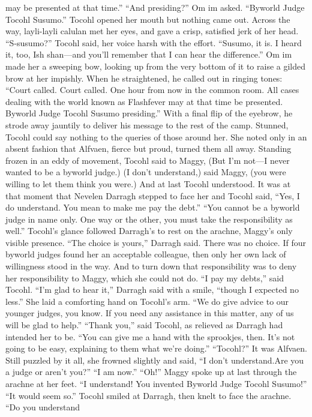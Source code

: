 \documentclass[9pt]{article}
\begin{document}
may be presented at that time.”
“And presiding?” Om im asked.
“Byworld Judge Tocohl Susumo.”
Tocohl opened her mouth but nothing came out. Across the way, layli-layli calulan met her eyes,
and gave a crisp, satisfied jerk of her head.
“S-susumo?” Tocohl said, her voice harsh with the effort.
“Susumo, it is. I heard it, too, Ish shan—and you’ll remember that I can hear the difference.” Om im
made her a sweeping bow, looking up from the very bottom of it to raise a gilded brow at her impishly.
When he straightened, he called out in ringing tones: “Court called. Court called. One hour from now in
the common room. All cases dealing with the world known as Flashfever may at that time be presented.
Byworld Judge Tocohl Susumo presiding.” With a final flip of the eyebrow, he strode away jauntily to
deliver his message to the rest of the camp.
Stunned, Tocohl could say nothing to the queries of those around her. She noted only in an absent
fashion that Alfvaen, fierce but proud, turned them all away. Standing frozen in an eddy of movement,
Tocohl said to Maggy, (But I’m not—I never wanted to be a byworld judge.)
(I don’t understand,) said Maggy, (you were willing to let them think you were.)
And at last Tocohl understood. It was at that moment that Nevelen Darragh stepped to face her and
Tocohl said, “Yes, I do understand. You mean to make me pay the debt.”
“You cannot be a byworld judge in name only. One way or the other, you must take the
responsibility as well.”
Tocohl’s glance followed Darragh’s to rest on the arachne, Maggy’s only visible presence. “The
choice is yours,” Darragh said.
There was no choice. If four byworld judges found her an acceptable colleague, then only her own
lack of willingness stood in the way. And to turn down that responsibility was to deny her responsibility
to Maggy, which she could not do.
“I pay my debts,” said Tocohl.
“I’m glad to hear it,” Darragh said with a smile, “though I expected no less.” She laid a comforting
hand on Tocohl’s arm. “We do give advice to our younger judges, you know. If you need any assistance
in this matter, any of us will be glad to help.”
“Thank you,” said Tocohl, as relieved as Darragh had intended her to be. “You can give me a hand
with the sprookjes, then. It’s not going to be easy, explaining to them what we’re doing.”
“Tocohl?” It was Alfvaen. Still puzzled by it all, she frowned slightly and said, “I don’t understand.Are you a judge or aren’t you?”
“I am now.”
“Oh!” Maggy spoke up at last through the arachne at her feet. “I understand! You invented Byworld
Judge Tocohl Susumo!”
“It would seem so.” Tocohl smiled at Darragh, then knelt to face the arachne. “Do you understand
\end{document}
